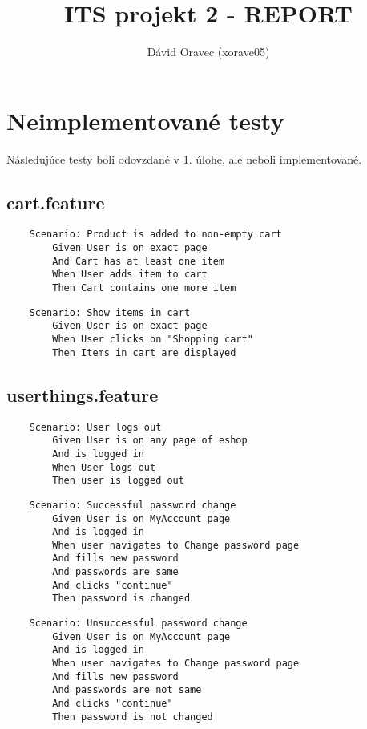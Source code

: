 \documentclass[titlepage]{article}
\begin{document}
    
    \title{ITS projekt 2 - REPORT}
    \author{Dávid Oravec (xorave05)}
    \maketitle

    \section{Neimplementované testy}
	Následujúce testy boli odovzdané v 1. úlohe, ale neboli implementované.
	\subsection{cart.feature}
	\begin{lstlisting}
	Scenario: Product is added to non-empty cart
        Given User is on exact page
        And Cart has at least one item
        When User adds item to cart
        Then Cart contains one more item
	\end{lstlisting}
	 \begin{lstlisting}
	Scenario: Show items in cart
        Given User is on exact page
        When User clicks on "Shopping cart"
        Then Items in cart are displayed
	\end{lstlisting}

	\subsection{userthings.feature}
	\begin{lstlisting}
	Scenario: User logs out
        Given User is on any page of eshop
        And is logged in
        When User logs out
        Then user is logged out
	\end{lstlisting}

	\begin{lstlisting}
	Scenario: Successful password change
        Given User is on MyAccount page
        And is logged in
        When user navigates to Change password page
        And fills new password
        And passwords are same
        And clicks "continue"
        Then password is changed
	\end{lstlisting}

	\begin{lstlisting}
	Scenario: Unsuccessful password change
        Given User is on MyAccount page
        And is logged in
        When user navigates to Change password page
        And fills new password
        And passwords are not same
        And clicks "continue"
        Then password is not changed
	\end{lstlisting}
\newpage
\end{document}
